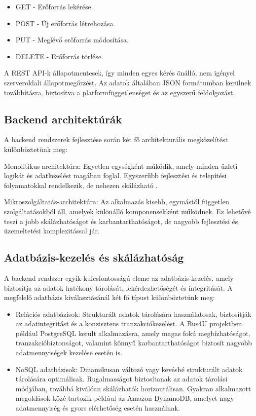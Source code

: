 \begin{itemize}
    \item GET - Erőforrás lekérése.
    \item POST - Új erőforrás létrehozása.
    \item PUT - Meglévő erőforrás módosítása.
    \item DELETE - Erőforrás törlése.
\end{itemize}

A REST API-k állapotmentesek, így minden egyes kérés önálló, nem igényel szerveroldali állapotmegőrzést. Az adatok általában JSON formátumban kerülnek továbbításra, biztosítva a platformfüggetlenséget és az egyszerű feldolgozást.

\subsection{Backend architektúrák}

A backend rendszerek fejlesztése során két fő architekturális megközelítést különböztetünk meg:

Monolitikus architektúra: Egyetlen egységként működik, amely minden üzleti logikát és adatkezelést magában foglal. Egyszerűbb fejlesztési és telepítési folyamatokkal rendelkezik, de nehezen skálázható \cite{al2018comparative}.

Mikroszolgáltatás-architektúra: Az alkalmazás kisebb, egymástól független szolgáltatásokból áll, amelyek különálló komponensekként működnek. Ez lehetővé teszi a jobb skálázhatóságot és karbantarthatóságot, de nagyobb fejlesztési és üzemeltetési komplexitással jár.

\subsection{Adatbázis-kezelés és skálázhatóság}

A backend rendszer egyik kulcsfontosságú eleme az adatbázis-kezelés, amely biztosítja az adatok hatékony tárolását, lekérdezhetőségét és integritását. A megfelelő adatbázis kiválasztásánál két fő típust különböztetünk meg:

\begin{itemize}
    \item Relációs adatbázisok: Strukturált adatok tárolására használatosak, biztosítják az adatintegritást és a konzisztens tranzakciókezelést. A Bus4U projektben például PostgreSQL került alkalmazásra, amely magas fokú megbízhatóságot, tranzakcióbiztonságot, valamint könnyű karbantarthatóságot biztosít nagyobb adatmennyiségek kezelése esetén is.
    
    \item NoSQL adatbázisok: Dinamikusan változó vagy kevésbé strukturált adatok tárolására optimálisak. Rugalmasságot biztosítanak az adatok tárolási módjában, továbbá kiválóan skálázhatók horizontálisan. Gyakran alkalmazott megoldások közé tartozik például az Amazon DynamoDB, amelyet nagy adatmennyiség és gyors elérhetőség esetén használnak.
\end{itemize}


